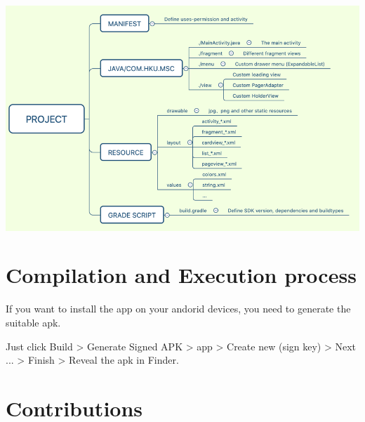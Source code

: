 \documentclass{article}
\begin{document}
    \begin{center}
        \includegraphics[width=5.5in]{structure}
    \end{center}

    \section{Compilation and Execution process}

    If you want to install the app on your andorid devices, 
    you need to generate the suitable apk. 
    
    Just click Build > Generate Signed APK > app > 
    Create new (sign key) > Next ... > Finish > Reveal the apk in Finder.

    \newpage
    \section{Contributions}
\end{document}
